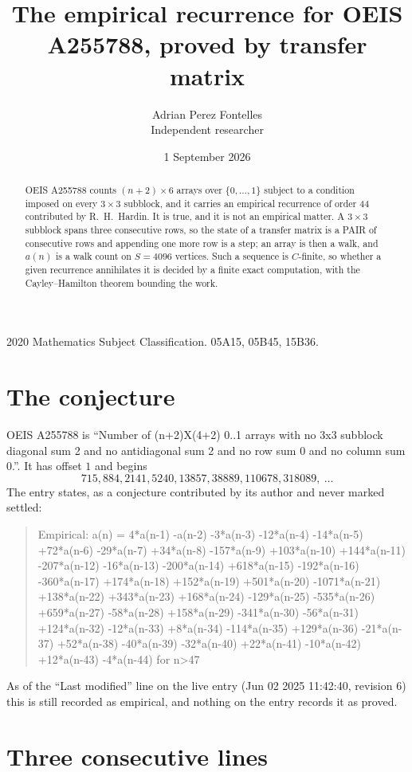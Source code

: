 \documentclass[11pt,a4paper]{article}
\title{The empirical recurrence for OEIS A255788, proved by transfer matrix}
\author{Adrian Perez Fontelles\\ \small Independent researcher}
\date{1 September 2026}
\theoremstyle{plain}
\theoremstyle{definition}
\begin{document}
\maketitle

\begin{abstract}
OEIS A255788 counts $(n+2)\times6$ arrays over $\{0,\dots,1\}$ subject to a condition imposed on
every $3\times3$ subblock, and it carries an empirical recurrence of order $44$
contributed by R.~H.~Hardin. It is true, and it is not an empirical matter. A $3\times3$
subblock spans three consecutive rows, so the state of a transfer matrix is a PAIR of
consecutive rows and appending one more row is a step; an array is then a walk, and
$a(n)$ is a walk count on $S=4096$ vertices. Such a sequence is $C$-finite, so whether a given
recurrence annihilates it is decided by a finite exact computation, with the Cayley--Hamilton
theorem bounding the work.
\end{abstract}

\noindent\small 2020 Mathematics Subject Classification. 05A15, 05B45, 15B36.\normalsize

\section{The conjecture}

OEIS A255788 is ``Number of (n+2)X(4+2) 0..1 arrays with no 3x3 subblock diagonal sum 2 and no antidiagonal sum 2 and no row sum 0 and no column sum 0.''. It has offset $1$ and begins
\[
715, 884, 2141, 5240, 13857, 38889, 110678, 318089,\ \dots
\]
The entry states, as a conjecture contributed by its author and never marked settled:
\begin{quote}
Empirical: a(n) = 4*a(n-1) -a(n-2) -3*a(n-3) -12*a(n-4) -14*a(n-5) +72*a(n-6) -29*a(n-7) +34*a(n-8) -157*a(n-9) +103*a(n-10) +144*a(n-11) -207*a(n-12) -16*a(n-13) -200*a(n-14) +618*a(n-15) -192*a(n-16) -360*a(n-17) +174*a(n-18) +152*a(n-19) +501*a(n-20) -1071*a(n-21) +138*a(n-22) +343*a(n-23) +168*a(n-24) -129*a(n-25) -535*a(n-26) +659*a(n-27) -58*a(n-28) +158*a(n-29) -341*a(n-30) -56*a(n-31) +124*a(n-32) -12*a(n-33) +8*a(n-34) -114*a(n-35) +129*a(n-36) -21*a(n-37) +52*a(n-38) -40*a(n-39) -32*a(n-40) +22*a(n-41) -10*a(n-42) +12*a(n-43) -4*a(n-44) for n>47
\end{quote}
As of the ``Last modified'' line on the live entry (Jun 02 2025 11:42:40, revision 6) this is still
recorded as empirical, and nothing on the entry records it as proved.

\section{Three consecutive lines}
\end{document}

